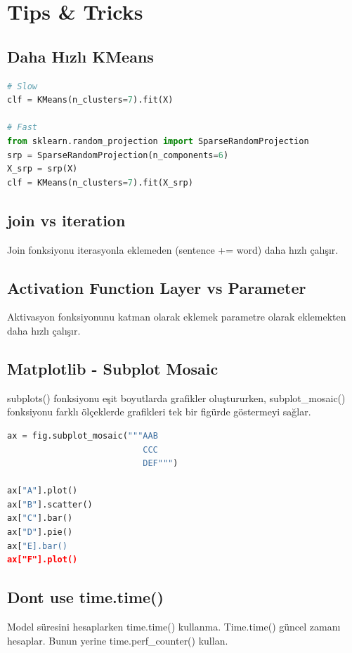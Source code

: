 \section{Tips \& Tricks}

\subsection{Daha Hızlı KMeans}
\begin{lstlisting}[language=Python]
# Slow
clf = KMeans(n_clusters=7).fit(X)

# Fast
from sklearn.random_projection import SparseRandomProjection
srp = SparseRandomProjection(n_components=6)
X_srp = srp(X)
clf = KMeans(n_clusters=7).fit(X_srp)
\end{lstlisting}

\subsection{join vs iteration}
Join fonksiyonu iterasyonla eklemeden (sentence += word) daha hızlı çalışır.

\subsection{Activation Function Layer vs Parameter}
Aktivasyon fonksiyonunu katman olarak eklemek parametre olarak eklemekten daha hızlı çalışır.

\subsection{Matplotlib - Subplot Mosaic}
subplots() fonksiyonu eşit boyutlarda grafikler oluştururken, subplot\_mosaic() fonksiyonu farklı ölçeklerde grafikleri tek bir figürde göstermeyi sağlar.

\begin{lstlisting}[language=Python]
ax = fig.subplot_mosaic("""AAB
                           CCC
                           DEF""")

ax["A"].plot()
ax["B"].scatter()
ax["C"].bar()
ax["D"].pie()
ax["E].bar()
ax["F"].plot()
\end{lstlisting}

\subsection{Dont use time.time()}
Model süresini hesaplarken time.time() kullanma. Time.time() güncel zamanı hesaplar. Bunun yerine time.perf\_counter() kullan.


